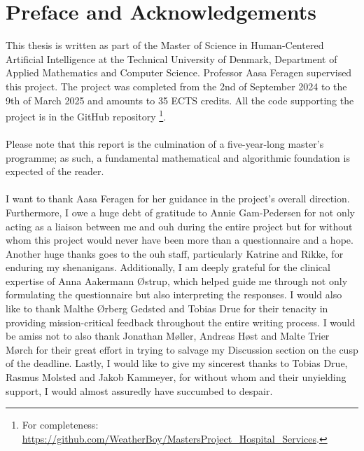 \section*{Preface and Acknowledgements}
This thesis is written as part of the Master of Science in Human-Centered Artificial Intelligence at the Technical University of Denmark, Department of Applied Mathematics and Computer Science. Professor Aasa Feragen supervised this project. The project was completed from the 2nd of September 2024 to the 9th of March 2025 and amounts to 35 ECTS credits. All the code supporting the project is in the GitHub repository \footnote{For completeness: \href{https://github.com/WeatherBoy/MastersProject_Hospital_Services}{https://github.com/WeatherBoy/MastersProject\_Hospital\_Services}.}.
\\
\\
Please note that this report is the culmination of a five-year-long master's programme; as such, a fundamental mathematical and algorithmic foundation is expected of the reader.
\\
\\
I want to thank Aasa Feragen for her guidance in the project's overall direction. Furthermore, I owe a huge debt of gratitude to Annie Gam-Pedersen for not only acting as a liaison between me and \acrshort{ouh} during the entire project but for without whom this project would never have been more than a questionnaire and a hope. Another huge thanks goes to the \acrshort{ouh} staff, particularly Katrine and Rikke, for enduring my shenanigans. Additionally, I am deeply grateful for the clinical expertise of Anna Aakermann \O strup, which helped guide me through not only formulating the questionnaire but also interpreting the responses.
I would also like to thank Malthe \O rberg Gedsted and Tobias Drue for their tenacity in providing mission-critical feedback throughout the entire writing process. I would be amiss not to also thank Jonathan M\o ller, Andreas H\o st and Malte Trier M\o rch for their great effort in trying to salvage my Discussion section on the cusp of the deadline.
Lastly, I would like to give my sincerest thanks to Tobias Drue, Rasmus Molsted and Jakob Kammeyer, for without whom and their unyielding support, I would almost assuredly have succumbed to despair.